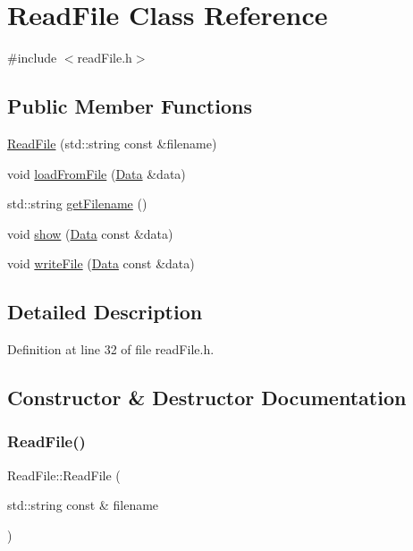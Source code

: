 \hypertarget{class_read_file}{}\section{Read\+File Class Reference}
\label{class_read_file}


{\ttfamily \#include $<$read\+File.\+h$>$}

\subsection*{Public Member Functions}
\begin{DoxyCompactItemize}
\item 
\mbox{\hyperlink{class_read_file_ae297f0539380fc9b703a1bceda2ce820}{Read\+File}} (std\+::string const \&filename)
\item 
void \mbox{\hyperlink{class_read_file_a232df426223b84e4dbb3f964ee4c3177}{load\+From\+File}} (\mbox{\hyperlink{struct_data}{Data}} \&data)
\item 
std\+::string \mbox{\hyperlink{class_read_file_a9835264c9ec95cfdbc1349573402fc01}{get\+Filename}} ()
\item 
void \mbox{\hyperlink{class_read_file_a5efc41b900510ae038dafc23a2563300}{show}} (\mbox{\hyperlink{struct_data}{Data}} const \&data)
\item 
void \mbox{\hyperlink{class_read_file_ac11779a3630a2c1d62ab4566abb4034a}{write\+File}} (\mbox{\hyperlink{struct_data}{Data}} const \&data)
\end{DoxyCompactItemize}


\subsection{Detailed Description}


Definition at line 32 of file read\+File.\+h.



\subsection{Constructor \& Destructor Documentation}
\mbox{\label{class_read_file_ae297f0539380fc9b703a1bceda2ce820}} 
\subsubsection{\texorpdfstring{Read\+File()}{ReadFile()}}
{\footnotesize\ttfamily Read\+File\+::\+Read\+File (\begin{DoxyParamCaption}\item[{std\+::string const \&}]{filename }\end{DoxyParamCaption})\hspace{0.3cm}{\ttfamily [explicit]}}







